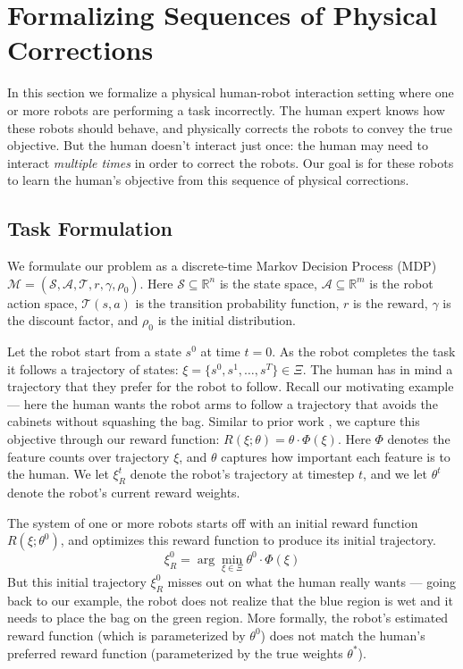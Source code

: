 \section{Formalizing Sequences of Physical Corrections}
\label{sec:formalism}

In this section we formalize a physical human-robot interaction setting where one or more robots are performing a task incorrectly. The human expert knows how these robots should behave, and physically corrects the robots to convey the true objective. But the human doesn't interact just once: the human may need to interact \textit{multiple times} in order to correct the robots. Our goal is for these robots to learn the human's objective from this sequence of physical corrections.


\subsection{Task Formulation} 
\label{sec:task_formulation}

We formulate our problem as a discrete-time Markov Decision Process (MDP) $\mathcal{M}=\left(\mathcal{S}, \mathcal{A}, \mathcal{T}, r, \gamma, \rho_{0}\right)$. Here $\mathcal{S} \subseteq \mathbb{R}^{n}$ is the  state space, $\mathcal{A} \subseteq \mathbb{R}^{m}$ is the robot action space, $\mathcal{T}(s, a)$ is the transition probability function, $r$ is the reward, $\gamma$ is the discount factor, and $\rho_{0}$ is the initial distribution.

\smallskip
{}
Let the robot start from a state $s^0$ at time $t=0$. As the robot completes the task it follows a trajectory of states: $\xi = \{s^0, s^1, \dots, s^T\} \in \Xi$. The human has in mind a trajectory that they prefer for the robot to follow. Recall our motivating example --- here the human wants the robot arms to follow a trajectory that avoids the cabinets without squashing the bag. Similar to prior work \cite{ziebart2008maximum, abbeel2004apprenticeship, osa2018algorithmic, jeon2020reward}, we capture this objective through our reward function:
$R(\xi; \theta) = \theta \cdot \Phi(\xi)$.
Here $\Phi$ denotes the feature counts over trajectory $\xi$, and $\theta$ captures how important each feature is to the human. We let $\xi_R^t$ denote the robot's trajectory at timestep $t$, and we let $\theta^t$ denote the robot's current reward weights.

\smallskip
{} The system of one or more robots starts off with an initial reward function $R(\xi; \theta^0)$, and optimizes this reward function to produce its initial trajectory.
$$\xi_R^{0}=\arg \min _{\xi \in \Xi} \theta^{0} \cdot \Phi(\xi)$$
But this initial trajectory $\xi_R^0$ misses out on what the human really wants --- going back to our example, the robot does not realize that the blue region is wet and it needs to place the bag on the green region.
More formally, the robot's estimated reward function (which is parameterized by $\theta^0$) does not match the human's preferred reward function (parameterized by the true weights $\theta^*$).

